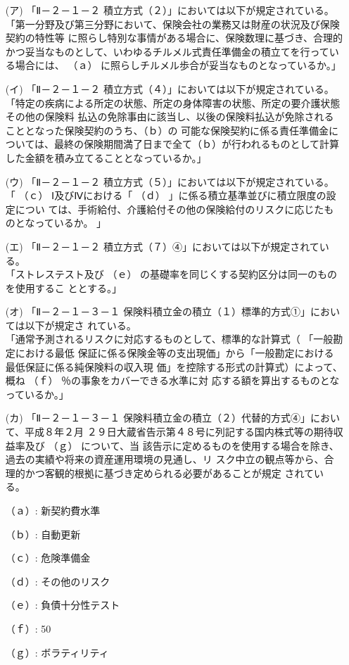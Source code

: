 \documentclass[report,gutter=10mm,fore-edge=10mm,uplatex,dvipdfmx]{jlreq}
\begin{document}
\begin{itemize}
 \item [(ア)]「Ⅱ－２－１－２ 積立方式（２）」においては以下が規定されている。\\
「第一分野及び第三分野において、保険会社の業務又は財産の状況及び保険契約の特性等
に照らし特別な事情がある場合に、保険数理に基づき、合理的かつ妥当なものとして、いわゆるチルメル式責任準備金の積立てを行っている場合には、 （ａ） に照らしチルメル歩合が妥当なものとなっているか。」
 \item [(イ)]「Ⅱ－２－１－２ 積立方式（４）」においては以下が規定されている。\\
「特定の疾病による所定の状態、所定の身体障害の状態、所定の要介護状態その他の保険料
払込の免除事由に該当し、以後の保険料払込が免除されることとなった保険契約のうち、（ｂ）の
可能な保険契約に係る責任準備金については、最終の保険期間満了日まで全て（ｂ）が行われるものとして計算した金額を積み立てることとなっているか。」
\item[(ウ)]「Ⅱ－２－１－２ 積立方式（５）」においては以下が規定されている。\\
「 （ｃ） Ⅰ及びⅣにおける「 （ｄ） 」に係る積立基準並びに積立限度の設定につい
ては、手術給付、介護給付その他の保険給付のリスクに応じたものとなっているか。
」
\item[(エ)]「Ⅱ－２－１－２ 積立方式（７）④」においては以下が規定されている。\\
「ストレステスト及び （ｅ） の基礎率を同じくする契約区分は同一のものを使用するこ
ととする。」
\item[(オ)]「Ⅱ－２－１－３－１ 保険料積立金の積立（１）標準的方式①」においては以下が規定さ
れている。\\
「通常予測されるリスクに対応するものとして、標準的な計算式（
「一般勘定における最低
保証に係る保険金等の支出現価」から「一般勘定における最低保証に係る純保険料の収入現
価」を控除する形式の計算式）によって、概ね （ｆ） ％の事象をカバーできる水準に対
応する額を算出するものとなっているか。」
\item[(カ)]「Ⅱ－２－１－３－１ 保険料積立金の積立（２）代替的方式④」において、平成８年２月
２９日大蔵省告示第４８号に列記する国内株式等の期待収益率及び （ｇ） について、当
該告示に定めるものを使用する場合を除き、過去の実績や将来の資産運用環境の見通し、リ
スク中立の観点等から、合理的かつ客観的根拠に基づき定められる必要があることが規定
されている。
\end{itemize}
\answer{}
\begin{itemize}
\item[ （ａ）: ] 新契約費水準
\item[ （ｂ）: ] 自動更新
\item[ （ｃ）: ] 危険準備金
\item[ （ｄ）: ] その他のリスク
\item[ （ｅ）: ] 負債十分性テスト
\item[ （ｆ）: ] 50
\item[ （ｇ）: ] ボラティリティ
\end{itemize}
\end{document}
